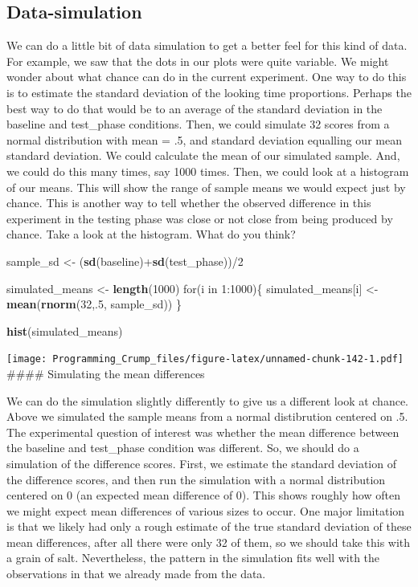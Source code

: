 \documentclass[]{book}
\newenvironment{Shaded}{\begin{snugshade}}{\end{snugshade}}
\newcommand{\KeywordTok}[1]{\textcolor[rgb]{0.13,0.29,0.53}{\textbf{{#1}}}}
\newcommand{\DecValTok}[1]{\textcolor[rgb]{0.00,0.00,0.81}{{#1}}}
\newcommand{\StringTok}[1]{\textcolor[rgb]{0.31,0.60,0.02}{{#1}}}
\newcommand{\NormalTok}[1]{{#1}}
\theoremstyle{definition}
\theoremstyle{definition}
\theoremstyle{definition}
\theoremstyle{remark}
\begin{document}
\subsection{Data-simulation}\label{data-simulation}

We can do a little bit of data simulation to get a better feel for this
kind of data. For example, we saw that the dots in our plots were quite
variable. We might wonder about what chance can do in the current
experiment. One way to do this is to estimate the standard deviation of
the looking time proportions. Perhaps the best way to do that would be
to an average of the standard deviation in the baseline and test\_phase
conditions. Then, we could simulate 32 scores from a normal distribution
with mean = .5, and standard deviation equalling our mean standard
deviation. We could calculate the mean of our simulated sample. And, we
could do this many times, say 1000 times. Then, we could look at a
histogram of our means. This will show the range of sample means we
would expect just by chance. This is another way to tell whether the
observed difference in this experiment in the testing phase was close or
not close from being produced by chance. Take a look at the histogram.
What do you think?

\begin{Shaded}
\begin{Highlighting}[]
\NormalTok{sample_sd   <-}\StringTok{ }\NormalTok{(}\KeywordTok{sd}\NormalTok{(baseline)+}\KeywordTok{sd}\NormalTok{(test_phase))/}\DecValTok{2}

\NormalTok{simulated_means <-}\StringTok{ }\KeywordTok{length}\NormalTok{(}\DecValTok{1000}\NormalTok{)}
\NormalTok{for(i in }\DecValTok{1}\NormalTok{:}\DecValTok{1000}\NormalTok{)\{}
 \NormalTok{simulated_means[i] <-}\StringTok{ }\KeywordTok{mean}\NormalTok{(}\KeywordTok{rnorm}\NormalTok{(}\DecValTok{32}\NormalTok{,.}\DecValTok{5}\NormalTok{, sample_sd))}
\NormalTok{\}}

\KeywordTok{hist}\NormalTok{(simulated_means)}
\end{Highlighting}
\end{Shaded}

\texttt{[image: Programming\_Crump\_files/figure-latex/unnamed-chunk-142-1.pdf]}
\#\#\#\# Simulating the mean differences

We can do the simulation slightly differently to give us a different
look at chance. Above we simulated the sample means from a normal
distibrution centered on .5. The experimental question of interest was
whether the mean difference between the baseline and test\_phase
condition was different. So, we should do a simulation of the difference
scores. First, we estimate the standard deviation of the difference
scores, and then run the simulation with a normal distribution centered
on 0 (an expected mean difference of 0). This shows roughly how often we
might expect mean differences of various sizes to occur. One major
limitation is that we likely had only a rough estimate of the true
standard deviation of these mean differences, after all there were only
32 of them, so we should take this with a grain of salt. Nevertheless,
the pattern in the simulation fits well with the observations in that we
already made from the data.
\end{document}
